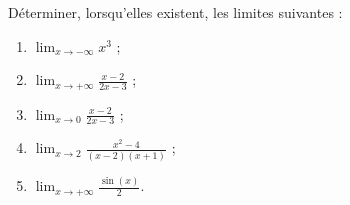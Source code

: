 
\begin{exercice}\label{exointerro-0007}

Déterminer, lorsqu'elles existent, les limites suivantes :
\begin{enumerate}
\item 
  $\displaystyle \lim_{x\to -\infty} x^3$ ;
  \item
    $\displaystyle \lim_{x\to +\infty}\frac{x-2}{2x-3}$ ;
    \item
      $\displaystyle \lim_{x\to 0}\frac{x-2}{2x-3}$ ;
      \item
        $\displaystyle \lim_{x\to 2}\frac{x^2-4}{(x-2)(x+1)}$ ;
        \item
          $\displaystyle \lim_{x\to +\infty}\frac{\sin(x)}{2}$.
          
\end{enumerate}


\end{exercice}
